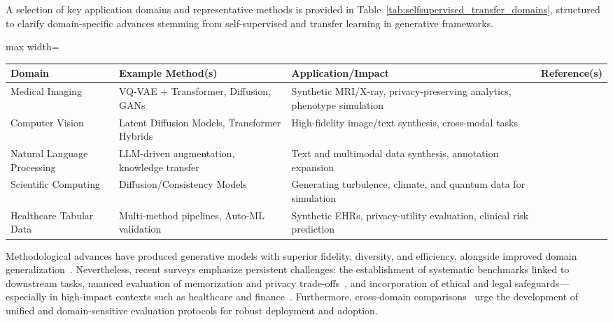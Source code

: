 \documentclass[sigconf]{acmart}
\begin{document}
A selection of key application domains and representative methods is provided in Table~\ref{tab:selfsupervised_transfer_domains}, structured to clarify domain-specific advances stemming from self-supervised and transfer learning in generative frameworks.

\begin{table*}[htbp]
\centering
\caption{Representative Applications of Self-Supervised and Transfer Learning in Generative Modeling}
\label{tab:selfsupervised_transfer_domains}
\begin{adjustbox}{max width=\textwidth}
\begin{tabular}{@{}llll@{}}
\toprule
Domain & Example Method(s) & Application/Impact & Reference(s) \\
\midrule
Medical Imaging         & VQ-VAE + Transformer, Diffusion, GANs          & Synthetic MRI/X-ray, privacy-preserving analytics, phenotype simulation    & \cite{ref1,ref3,ref12,ref60,ref89,ref91} \\
Computer Vision         & Latent Diffusion Models, Transformer Hybrids   & High-fidelity image/text synthesis, cross-modal tasks                      & \cite{ref100,ref101,ref102,ref95,ref96} \\
Natural Language Processing & LLM-driven augmentation, knowledge transfer & Text and multimodal data synthesis, annotation expansion                   & \cite{ref14,ref25,ref62,ref65} \\
Scientific Computing    & Diffusion/Consistency Models                   & Generating turbulence, climate, and quantum data for simulation            & \cite{ref15,ref16,ref73} \\
Healthcare Tabular Data & Multi-method pipelines, Auto-ML validation     & Synthetic EHRs, privacy-utility evaluation, clinical risk prediction       & \cite{ref1,ref2,ref3,ref12,ref13} \\
\bottomrule
\end{tabular}
\end{adjustbox}
\end{table*}

Methodological advances have produced generative models with superior fidelity, diversity, and efficiency, alongside improved domain generalization~\cite{ref79,ref100,ref101,ref102}. Nevertheless, recent surveys emphasize persistent challenges: the establishment of systematic benchmarks linked to downstream tasks, nuanced evaluation of memorization and privacy trade-offs~\cite{ref21,ref91}, and incorporation of ethical and legal safeguards—especially in high-impact contexts such as healthcare and finance~\cite{ref89,ref91,ref13}. Furthermore, cross-domain comparisons~\cite{ref5,ref6,ref12,ref14,ref64} urge the development of unified and domain-sensitive evaluation protocols for robust deployment and adoption.
\end{document}
